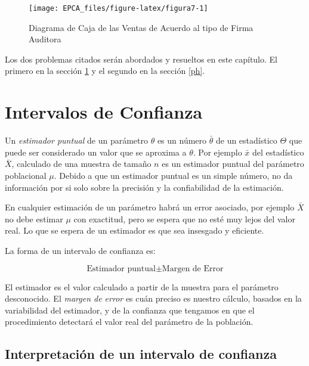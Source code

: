 \documentclass[
]{krantz}
\begin{document}
\begin{figure}[h!]

{\centering \texttt{[image: EPCA\_files/figure-latex/figura7-1]} 

}

\caption{Diagrama de Caja de las Ventas de Acuerdo al tipo de Firma Auditora}\label{fig:figura7}
\end{figure}

Los dos problemas citados serán abordados y resueltos en este capítulo. El primero en la sección \ref{ic} y el segundo en la sección \ref{ph}.

\hypertarget{ic}{%
\section{Intervalos de Confianza}\label{ic}}

Un \emph{estimador puntual} de un parámetro \(\theta\) es un número \(\bar{\theta}\) de un estadístico \(\Theta\) que puede ser considerado un valor que se aproxima a \(\theta\). Por ejemplo \(\bar{x}\) del estadístico \(\bar{X}\), calculado de una muestra de tamaño \(n\) es un estimador puntual del parámetro poblacional \(\mu\). Debido a que un estimador puntual es un simple número, no da información por si solo sobre la precisión y la confiabilidad de la estimación.

En cualquier estimación de un parámetro habrá un error asociado, por ejemplo \(\bar{X}\) no debe estimar \(\mu\) con exactitud, pero se espera que no esté muy lejos del valor real. Lo que se espera de un estimador es que sea insesgado y eficiente.

La forma de un intervalo de confianza es:

\begin{equation} 
  \text{Estimador puntual} \pm \text{Margen de Error}
  \label{eq:ic}
\end{equation}

El estimador es el valor calculado a partir de la muestra para el parámetro desconocido. El \emph{margen de error} es cuán preciso es nuestro cálculo, basados en la variabilidad del estimador, y de la confianza que tengamos en que el procedimiento detectará el valor real del parámetro de la población.

\hypertarget{interpretacion-de-un-intervalo-de-confianza}{%
\subsection{Interpretación de un intervalo de confianza}\label{interpretacion-de-un-intervalo-de-confianza}}
\end{document}
